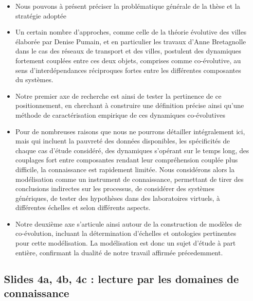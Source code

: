 \documentclass[11pt]{article}
\begin{document}
\begin{itemize}
	\item Nous pouvons à présent préciser la problématique générale de la thèse et la stratégie adoptée
	\item Un certain nombre d'approches, comme celle de la théorie évolutive des villes élaborée par Denise Pumain, et en particulier les travaux d'Anne Bretagnolle dans le cas des réseaux de transport et des villes, postulent des dynamiques fortement couplées entre ces deux objets, comprises comme co-évolutive, au sens d'interdépendances réciproques fortes entre les différentes composantes du systèmes.
	\item Notre premier axe de recherche est ainsi de tester la pertinence de ce positionnement, en cherchant à construire une définition précise ainsi qu'une méthode de caractérisation empirique de ces dynamiques co-évolutives
	\item Pour de nombreuses raisons que nous ne pourrons détailler intégralement ici, mais qui incluent la pauvreté des données disponibles, les spécificités de chaque cas d'étude considéré, des dynamiques s'opérant sur le temps long, des couplages fort entre composantes rendant leur compréhension couplée plus difficile, la connaissance est rapidement limitée. Nous considérons alors la modélisation comme un instrument de connaissance, permettant de tirer des conclusions indirectes sur les processus, de considérer des systèmes génériques, de tester des hypothèses dans des laboratoires virtuels, à différentes échelles et selon différents aspects.
	\item Notre deuxième axe s'articule ainsi autour de la construction de modèles de co-évolution, incluant la détermination d'échelles et ontologies pertinentes pour cette modélisation. La modélisation est donc un sujet d'étude à part entière, confirmant la dualité de notre travail affirmée précedemment. 
\end{itemize}



\subsection*{Slides 4a, 4b, 4c : lecture par les domaines de connaissance}
\end{document}
